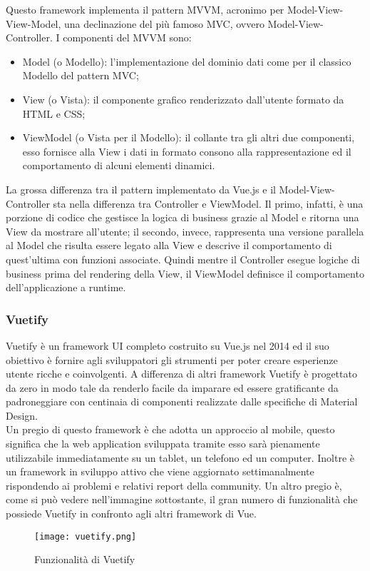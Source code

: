 Questo framework implementa il pattern MVVM, acronimo per Model-View-View-Model, una declinazione del più famoso MVC, ovvero Model-View-Controller. I componenti del MVVM sono:
\begin{itemize}
	\item Model (o Modello): l'implementazione del dominio dati come per il classico Modello del pattern MVC;
	\item View (o Vista): il componente grafico renderizzato dall'utente formato da HTML e CSS;
	\item ViewModel (o Vista per il Modello): il collante tra gli altri due componenti, esso fornisce alla View i dati in formato consono alla rappresentazione ed il comportamento di alcuni elementi dinamici.
\end{itemize}
La grossa differenza tra il pattern implementato da Vue.js e il Model-View-Controller sta nella differenza tra Controller e ViewModel. Il primo, infatti, è una porzione di codice che gestisce la logica di business grazie al Model e ritorna una View da mostrare all'utente; il secondo, invece, rappresenta una versione parallela al Model che risulta essere legato alla View e descrive il comportamento di quest'ultima con funzioni associate. Quindi mentre il Controller esegue logiche di business prima del rendering della View, il ViewModel definisce il comportamento dell'applicazione a runtime.

\subsubsection*{Vuetify}
Vuetify è un framework UI completo costruito su Vue.js nel 2014 ed il suo obiettivo è fornire agli sviluppatori gli strumenti per poter creare esperienze utente ricche e coinvolgenti. A differenza di altri framework Vuetify è progettato da zero in modo tale da renderlo facile da imparare ed essere gratificante da padroneggiare con centinaia di componenti realizzate dalle specifiche di Material Design.\\
Un pregio di questo framework è che adotta un approccio al mobile, questo significa che la web application sviluppata tramite esso sarà pienamente utilizzabile immediatamente su un tablet, un telefono ed un computer. Inoltre è un framework in sviluppo attivo che viene aggiornato settimanalmente rispondendo ai problemi e relativi report della community. Un altro pregio è, come si può vedere nell'immagine sottostante, il gran numero di funzionalità che possiede Vuetify in confronto agli altri framework di Vue.
\begin{figure}[H]
	\begin{center}
		\texttt{[image: vuetify.png]}
		\caption{Funzionalità di Vuetify}
	\end{center}
\end{figure}

